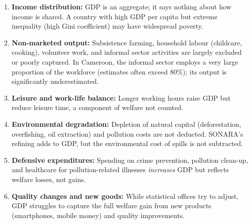 \documentclass[11pt]{article}
\begin{document}
\begin{aretenir}
\begin{enumerate}
\item \textbf{Income distribution:} GDP is an aggregate; it says nothing about how income is shared. A country with high GDP per capita but extreme inequality (high Gini coefficient) may have widespread poverty.
\item \textbf{Non-marketed output:} Subsistence farming, household labour (childcare, cooking), volunteer work, and informal sector activities are largely excluded or poorly captured. In Cameroon, the informal sector employs a very large proportion of the workforce (estimates often exceed 80\%); its output is significantly underestimated.
\item \textbf{Leisure and work-life balance:} Longer working hours raise GDP but reduce leisure time, a component of welfare not counted.
\item \textbf{Environmental degradation:} Depletion of natural capital (deforestation, overfishing, oil extraction) and pollution costs are not deducted. SONARA's refining adds to GDP, but the environmental cost of spills is not subtracted.
\item \textbf{Defensive expenditures:} Spending on crime prevention, pollution clean-up, and healthcare for pollution-related illnesses \emph{increases} GDP but reflects welfare losses, not gains.
\item \textbf{Quality changes and new goods:} While statistical offices try to adjust, GDP struggles to capture the full welfare gain from new products (smartphones, mobile money) and quality improvements.
\end{enumerate}
\end{aretenir}
\end{document}
